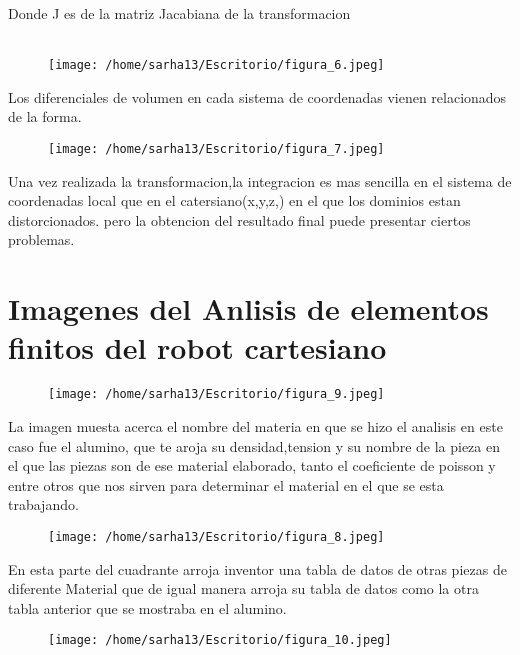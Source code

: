 \documentclass[letter,openright,12pt,spanish]{report}
\begin{document}
Donde J es de la matriz Jacabiana de la transformacion\\\\

\begin{figure}[htp!]
\centering
\texttt{[image: /home/sarha13/Escritorio/figura\_6.jpeg]}
\caption{}
\label{Figura 7.}
\end{figure}

Los diferenciales de volumen en cada sistema de coordenadas vienen relacionados de la forma.

\begin{figure}[htp!]
\centering
\texttt{[image: /home/sarha13/Escritorio/figura\_7.jpeg]}
\caption{}
\label{Figura 7.}
\end{figure}

Una vez realizada la transformacion,la integracion es mas sencilla en el sistema de coordenadas local que en el catersiano(x,y,z,) en el que los dominios estan distorcionados. pero la obtencion del resultado final puede presentar ciertos problemas.

\section{Imagenes del Anlisis de elementos finitos del robot cartesiano}

\begin{figure}[htp!]
\centering
\texttt{[image: /home/sarha13/Escritorio/figura\_9.jpeg]}
\caption{}
\label{Figura 7.}
\end{figure}

La imagen muesta acerca el nombre del materia en que se hizo el analisis en este caso fue el alumino, que te aroja su densidad,tension y su nombre de la pieza en el que las piezas son de ese material elaborado, tanto el coeficiente de poisson y entre otros que nos sirven para determinar el material en el que se esta trabajando.

\begin{figure}[htp!]
\centering
\texttt{[image: /home/sarha13/Escritorio/figura\_8.jpeg]}
\caption{}
\label{Figura 7.}
\end{figure}

En esta parte del cuadrante arroja inventor una tabla de datos de otras piezas de diferente Material que de igual manera arroja su tabla de datos como la otra tabla anterior que se mostraba en el alumino.

\begin{figure}[htp!]
\centering
\texttt{[image: /home/sarha13/Escritorio/figura\_10.jpeg]}
\caption{}
\label{Figura 11.}
\end{figure}
\end{document}
